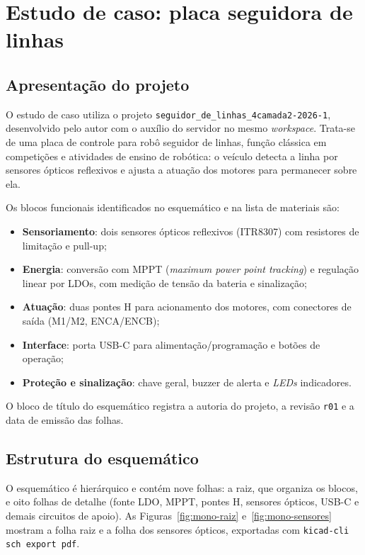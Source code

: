 \chapter{Estudo de caso: placa seguidora de linhas}\label{cap:estudo-de-caso}

\section{Apresentação do projeto}

O estudo de caso utiliza o projeto \texttt{seguidor\_de\_linhas\_4camada2-2026-1},
desenvolvido pelo autor com o auxílio do servidor no mesmo \emph{workspace}.
Trata-se de uma placa de controle para robô seguidor de linhas, função
clássica em competições e
atividades de ensino de robótica: o veículo detecta a linha por sensores
ópticos reflexivos e ajusta a atuação dos motores para permanecer sobre ela.

Os blocos funcionais identificados no esquemático e na lista de materiais são:

\begin{itemize}[leftmargin=1.4em,itemsep=0.2em]
  \item \textbf{Sensoriamento}: dois sensores ópticos reflexivos
        (ITR8307) com resistores de limitação e pull-up;
  \item \textbf{Energia}: conversão com MPPT (\emph{maximum power point
        tracking}) e regulação linear por LDOs, com medição de tensão da
        bateria e sinalização;
  \item \textbf{Atuação}: duas pontes H para acionamento dos motores, com
        conectores de saída (M1/M2, ENCA/ENCB);
  \item \textbf{Interface}: porta USB-C para alimentação/programação e
        botões de operação;
  \item \textbf{Proteção e sinalização}: chave geral, buzzer de alerta e
        \emph{LEDs} indicadores.
\end{itemize}

O bloco de título do esquemático registra a autoria do projeto, a revisão
\texttt{r01} e a data de emissão das folhas.

\section{Estrutura do esquemático}

O esquemático é hierárquico e contém nove folhas: a raiz, que organiza os
blocos, e oito folhas de detalhe (fonte LDO, MPPT, pontes H, sensores ópticos,
USB-C e demais circuitos de apoio). As Figuras~\ref{fig:mono-raiz}
e~\ref{fig:mono-sensores} mostram a folha raiz e a folha dos sensores ópticos,
exportadas com \texttt{kicad-cli sch export pdf}.


